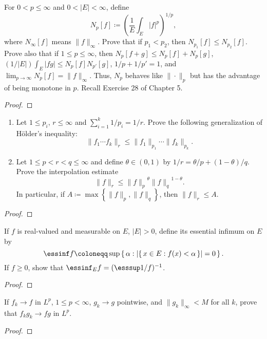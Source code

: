 \begin{problem}
For $0<p\leq\infty$ and $0<|E|<\infty$, define
\[
N_p[f]\coloneqq\left(\frac{1}{E}\int_E|f|^p\right)^{1/p},
\]
where $N_\infty[f]$ means $\|f\|_\infty$. Prove that if $p_1<p_2$, then
$N_{p_1}[f]\leq N_{p_2}[f]$. Prove also that if $1\leq p\leq \infty$, then
$N_p[f+g]\leq N_p[f]+N_p[g]$, $(1/|E|)\int_E|fg|\leq N_p[f]N_{p'}[g]$,
$1/p+1/p'=1$, and $\lim_{p\to\infty} N_p[f]=\|f\|_\infty$. Thus, $N_p$
behaves like $\|\cdot\|_p$ but has the advantage of being monotone in
$p$. Recall Exercise 28 of Chapter 5.
\end{problem}
\begin{proof}
\end{proof}
\newpage

\begin{problem}
\begin{enumerate}[label=(\alph*)]
\item Let $1\leq p_i$, $r\leq\infty$ and $\sum_{i=1}^k1/p_i=1/r$. Prove the
  following generalization of Hölder's inequality:
\[
\|f_1\dotsm f_k\|_r\leq\|f_1\|_{p_1}\dotsm\|f_k\|_{p_k}.
\]
\item Let $1\leq p<r<q\leq\infty$ and define $\theta\in(0,1)$ by
  $1/r=\theta/p+(1-\theta)/q$. Prove the interpolation estimate
\[
\|f\|_r\leq{\|f\|_p}^\theta{\|f\|_q}^{1-\theta}.
\]
In particular, if $A\coloneqq\max\left\{\|f\|_p,\|f\|_q\right\}$, then
$\|f\|_r\leq A$.
\end{enumerate}
\end{problem}
\begin{proof}
\end{proof}
\newpage

\begin{problem}
If $f$ is real-valued and measurable on $E$, $|E|>0$, define its essential
infimum on $E$ by
\[
\essinf f\coloneqq\sup\left\{\,\alpha:\left|\{\,x\in
    E:f(x)<\alpha\,\}\right|=0\,\right\}.
\]
If $f\geq 0$, show that $\essinf_E f=(\esssup 1/f)^{-1}$.
\end{problem}
\begin{proof}
\end{proof}
\newpage

\begin{problem}
If $f_k\to f$ in $L^p$, $1\leq p<\infty$, $g_k\to g$ pointwise, and
$\|g_k\|_\infty<M$ for all $k$, prove that $f_kg_k\to fg$ in $L^p$.
\end{problem}
\begin{proof}
\end{proof}

